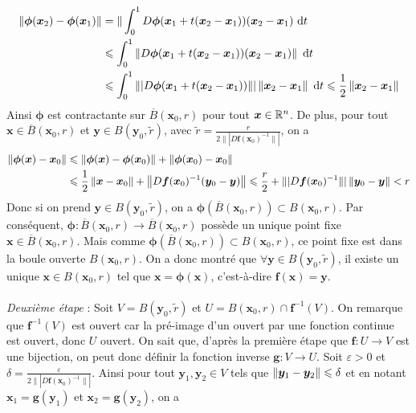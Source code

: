 {	\begin{align*}
		\left\| \bm \phi(\bm x_2) - \bm \phi(\bm x_1) \right\| &= \| \int_0^1 D \bm \phi (\bm x_1 + t(\bm x_2 - \bm x_1)) (\bm x_2 - \bm x_1) ~\mathrm dt \\
													&\leqslant \int_0^1 \left\| D \bm \phi(\bm x_1 + t(\bm x_2 - \bm x_1)) (\bm x_2 - \bm x_1) \right\| ~\mathrm dt \\
													& \leqslant \int_0^1 \|| D \bm \phi(\bm x_1 + t(\bm x_2 - \bm x_1)) \|| \left\| \bm x_2 - \bm x_1 \right\| ~\mathrm dt \leqslant \frac{1}{2} \left\| \bm x_2 - \bm x_1 \right\|
	\end{align*}
	Ainsi $\bm \phi$ est contractante sur $\overline B(\bm x_0, r)$ pour tout $\bm x \in \mathbb R^n$. De plus, pour tout $\bm x \in \overline B(\bm x_0,r)$ et $\bm y \in B(\bm y_0, \tilde r)$, avec $\tilde r = \frac{r}{2 \|| D \bm f(\bm x_0)^{-1}\||}$, on a
	\begin{align*}
		\left\| \bm \phi(\bm x) - \bm  x_0 \right\|   &\leqslant \left\| \bm \phi(\bm x) - \bm \phi(\bm x_0) \right\| + \left\| \bm \phi (\bm x_0) - \bm x_0 \right\| \\
												&\leqslant \frac{1}{2} \left\| \bm x -\bm x_0 \right\| + \left\| D \bm f(\bm x_0)^{-1} (\bm y_0 - \bm y) \right\| \leqslant \frac{r}{2} + \|| D \bm f(\bm x_0)^{-1} \||  \left\| \bm y_0 - \bm y \right\| < r		
	\end{align*}
	Donc si on prend $\bm y \in B(\bm y_0, \tilde r)$, on a $\bm \phi (\overline B(\bm x_0, r)) \subset B(\bm x_0, r)$. Par conséquent, $\bm \phi : \overline B(\bm x_0, r) \to \overline B(\bm x_0, r)$ possède un unique point fixe $\bm x \in \overline B(\bm x_0, r)$. Mais comme $\bm \phi (\overline B(\bm x_0, r)) \subset B(\bm x_0, r)$, ce point fixe est dans la boule ouverte $B(\bm x_0, r)$. On a donc montré que $\forall \bm y \in B(\bm y_0, \tilde r)$, il existe un unique $\bm x \in B(\bm x_0, r)$ tel que $\bm x = \bm \phi(\bm x)$, c'est-à-dire $\bm f(\bm x) = \bm y$. \\ \\
	\textit{Deuxième étape} : Soit $V = B(\bm y_0, \tilde r)$ et $U = B(\bm x_0, r) \cap \bm f^{-1} (V)$. On remarque que $\bm f^{-1} (V)$ est ouvert car la pré-image d'un ouvert par une fonction continue est ouvert, donc $U$ ouvert. On sait que, d'après la première étape que $\bm f: U \to V$ est une bijection, on peut donc définir la fonction inverse $\bm g : V \to U$. Soit $\varepsilon > 0$ et $\delta = \frac{\varepsilon}{2 \|| D \bm f(\bm x_0)^{-1} \||}$. Ainsi pour tout $\bm y_1, \bm y_2 \in V$ tels que $\left\| \bm y_1 - \bm y_2 \right\| \leqslant \delta$ et en notant $\bm x_1 = \bm g(\bm y_1)$ et $\bm x_2 = \bm g(\bm y_2)$, on a
}
